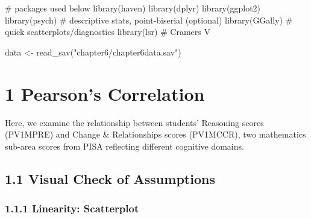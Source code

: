 \documentclass[
  letterpaper,
  DIV=11,
  numbers=noendperiod]{scrreprt}
\newenvironment{Shaded}{\begin{snugshade}}{\end{snugshade}}
\newcommand{\CommentTok}[1]{\textcolor[rgb]{0.37,0.37,0.37}{#1}}
\newcommand{\FunctionTok}[1]{\textcolor[rgb]{0.28,0.35,0.67}{#1}}
\newcommand{\NormalTok}[1]{\textcolor[rgb]{0.00,0.23,0.31}{#1}}
\newcommand{\OtherTok}[1]{\textcolor[rgb]{0.00,0.23,0.31}{#1}}
\newcommand{\StringTok}[1]{\textcolor[rgb]{0.13,0.47,0.30}{#1}}
\begin{document}
\begin{Shaded}
\begin{Highlighting}[]
\CommentTok{\# packages used below }
\FunctionTok{library}\NormalTok{(haven) }
\FunctionTok{library}\NormalTok{(dplyr) }
\FunctionTok{library}\NormalTok{(ggplot2) }
\FunctionTok{library}\NormalTok{(psych)      }\CommentTok{\# descriptive stats, point{-}biserial (optional) }
\FunctionTok{library}\NormalTok{(GGally)     }\CommentTok{\# quick scatterplots/diagnostics }
\FunctionTok{library}\NormalTok{(lsr)        }\CommentTok{\# Cramer\textquotesingle{}s V }
 
\NormalTok{data }\OtherTok{\textless{}{-}} \FunctionTok{read\_sav}\NormalTok{(}\StringTok{"chapter6/chapter6data.sav"}\NormalTok{) }
\end{Highlighting}
\end{Shaded}

\section*{1 Pearson's Correlation}\label{pearsons-correlation}


Here, we examine the relationship between students' Reasoning scores
(PV1MPRE) and Change \& Relationships scores (PV1MCCR), two mathematics
sub-area scores from PISA reflecting different cognitive domains.

\subsection*{1.1 Visual Check of
Assumptions}\label{visual-check-of-assumptions}

\subsubsection*{1.1.1 Linearity:
Scatterplot}\label{linearity-scatterplot}
\end{document}
